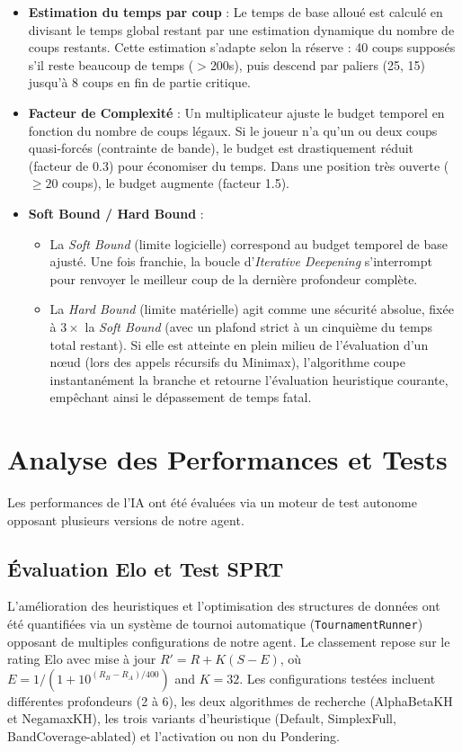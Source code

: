 \documentclass[12pt,a4paper]{article}
\begin{document}
\begin{itemize}
    \item \textbf{Estimation du temps par coup} : Le temps de base alloué est calculé en divisant le temps global restant par une estimation dynamique du nombre de coups restants. Cette estimation s'adapte selon la réserve : 40 coups supposés s'il reste beaucoup de temps ($>$200s), puis descend par paliers (25, 15) jusqu'à 8 coups en fin de partie critique.
    \item \textbf{Facteur de Complexité} : Un multiplicateur ajuste le budget temporel en fonction du nombre de coups légaux. Si le joueur n'a qu'un ou deux coups quasi-forcés (contrainte de bande), le budget est drastiquement réduit (facteur de 0.3) pour économiser du temps. Dans une position très ouverte ($\ge 20$ coups), le budget augmente (facteur 1.5).
    \item \textbf{Soft Bound / Hard Bound} : 
    \begin{itemize}
        \item La \textit{Soft Bound} (limite logicielle) correspond au budget temporel de base ajusté. Une fois franchie, la boucle d'\textit{Iterative Deepening} s'interrompt pour renvoyer le meilleur coup de la dernière profondeur complète.
        \item La \textit{Hard Bound} (limite matérielle) agit comme une sécurité absolue, fixée à $3 \times$ la \textit{Soft Bound} (avec un plafond strict à un cinquième du temps total restant). Si elle est atteinte en plein milieu de l'évaluation d'un nœud (lors des appels récursifs du Minimax), l'algorithme coupe instantanément la branche et retourne l'évaluation heuristique courante, empêchant ainsi le dépassement de temps fatal.
    \end{itemize}
\end{itemize}

\section{Analyse des Performances et Tests}
Les performances de l'IA ont été évaluées via un moteur de test autonome opposant plusieurs versions de notre agent.

\subsection{Évaluation Elo et Test SPRT}
L'amélioration des heuristiques et l'optimisation des structures de données ont été quantifiées via un système de tournoi automatique (\texttt{TournamentRunner}) opposant de multiples configurations de notre agent. Le classement repose sur le rating Elo avec mise à jour $R' = R + K(S - E)$, où $E = 1/(1 + 10^{(R_B - R_A)/400})$ and $K = 32$. Les configurations testées incluent différentes profondeurs (2 à 6), les deux algorithmes de recherche (AlphaBetaKH et NegamaxKH), les trois variants d'heuristique (Default, SimplexFull, BandCoverage-ablated) et l'activation ou non du Pondering.
\end{document}
